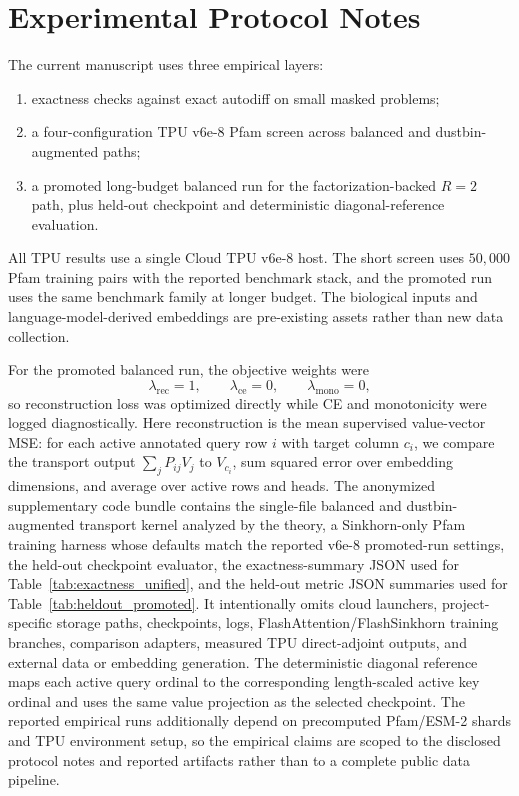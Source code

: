 \section{Experimental Protocol Notes}
\label{app:protocol}

The current manuscript uses three empirical layers:
\begin{enumerate}
    \item exactness checks against exact autodiff on small masked problems;
    \item a four-configuration TPU v6e-8 Pfam screen across balanced and dustbin-augmented paths;
    \item a promoted long-budget balanced run for the factorization-backed $R=2$ path, plus held-out checkpoint and deterministic diagonal-reference evaluation.
\end{enumerate}

All TPU results use a single Cloud TPU v6e-8 host. The short screen uses $50{,}000$ Pfam training pairs with the reported benchmark stack, and the promoted run uses the same benchmark family at longer budget. The biological inputs and language-model-derived embeddings are pre-existing assets rather than new data collection.

For the promoted balanced run, the objective weights were
\[
\lambda_{\mathrm{rec}}=1,\qquad \lambda_{\mathrm{ce}}=0,\qquad \lambda_{\mathrm{mono}}=0,
\]
so reconstruction loss was optimized directly while CE and monotonicity were logged diagnostically.
Here reconstruction is the mean supervised value-vector MSE: for each active annotated query row $i$ with target column $c_i$, we compare the transport output $\sum_j P_{ij}V_j$ to $V_{c_i}$, sum squared error over embedding dimensions, and average over active rows and heads.
The anonymized supplementary code bundle contains the single-file balanced and dustbin-augmented transport kernel analyzed by the theory, a Sinkhorn-only Pfam training harness whose defaults match the reported v6e-8 promoted-run settings, the held-out checkpoint evaluator, the exactness-summary JSON used for Table~\ref{tab:exactness_unified}, and the held-out metric JSON summaries used for Table~\ref{tab:heldout_promoted}. It intentionally omits cloud launchers, project-specific storage paths, checkpoints, logs, FlashAttention/FlashSinkhorn training branches, comparison adapters, measured TPU direct-adjoint outputs, and external data or embedding generation. The deterministic diagonal reference maps each active query ordinal to the corresponding length-scaled active key ordinal and uses the same value projection as the selected checkpoint. The reported empirical runs additionally depend on precomputed Pfam/ESM-2 shards and TPU environment setup, so the empirical claims are scoped to the disclosed protocol notes and reported artifacts rather than to a complete public data pipeline.

